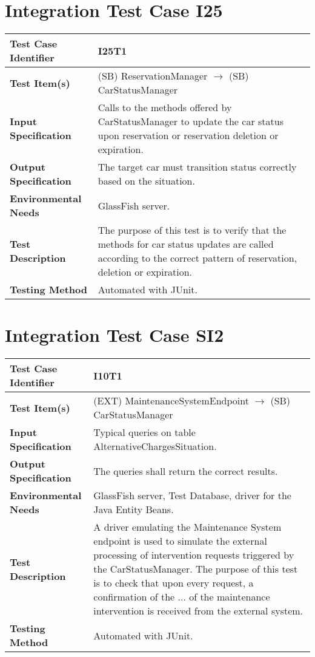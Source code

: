 \section{Integration Test Case I25}

\begin{longtable}{p{} | p{}}
\textbf{Test Case Identifier} & I25T1\\
\hline
\textbf{Test Item(s)} & (SB) ReservationManager $\rightarrow$ (SB) CarStatusManager \\
\hline
\textbf{Input Specification} & Calls to the methods offered by CarStatusManager to update the car status upon reservation or reservation deletion or expiration. \\
\hline
\textbf{Output Specification} & The target car must transition status correctly based on the situation. \\
\hline
\textbf{Environmental Needs} & GlassFish server. \\
\hline
\textbf{Test Description} & The purpose of this test is to verify that the methods for car status updates are called according to the correct pattern of reservation, deletion or expiration. \\
\hline
\textbf{Testing Method} & Automated with JUnit. \\
\hline
\end{longtable}


\section{Integration Test Case SI2}

\begin{longtable}{p{} | p{}}
\textbf{Test Case Identifier} & I10T1\\
\hline
\textbf{Test Item(s)} & (EXT) MaintenanceSystemEndpoint $\rightarrow$ (SB) CarStatusManager \\
\hline
\textbf{Input Specification} & Typical queries on table AlternativeChargesSituation. \\
\hline
\textbf{Output Specification} & The queries shall return the correct results. \\
\hline
\textbf{Environmental Needs} & GlassFish server, Test Database, driver for the Java Entity Beans. \\
\hline
\textbf{Test Description} & A driver emulating the Maintenance System endpoint is used to simulate the external processing of intervention requests triggered by the CarStatusManager. The purpose of this test is to check that upon every request, a confirmation of the ... of the maintenance intervention is received from the external system. \\
\hline
\textbf{Testing Method} & Automated with JUnit. \\
\hline
\end{longtable}